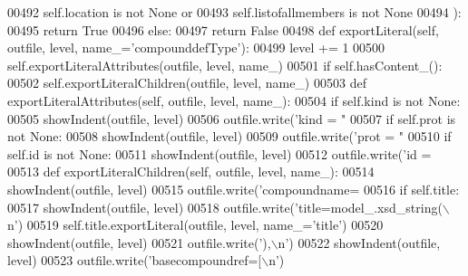 \begin{DoxyCode}
{{{{{{{{{{{{{{{{{{{{{{{{{{{{{{{00492             self.location \textcolor{keywordflow}{is} \textcolor{keywordflow}{not} \textcolor{keywordtype}{None} \textcolor{keywordflow}{or}
00493             self.listofallmembers \textcolor{keywordflow}{is} \textcolor{keywordflow}{not} \textcolor{keywordtype}{None}
00494             ):
00495             \textcolor{keywordflow}{return} \textcolor{keyword}{True}
00496         \textcolor{keywordflow}{else}:
00497             \textcolor{keywordflow}{return} \textcolor{keyword}{False}
00498     \textcolor{keyword}{def }exportLiteral(self, outfile, level, name\_='compounddefType'):
00499         level += 1
00500         self.exportLiteralAttributes(outfile, level, name\_)
00501         \textcolor{keywordflow}{if} self.hasContent_():
00502             self.exportLiteralChildren(outfile, level, name\_)
00503     \textcolor{keyword}{def }exportLiteralAttributes(self, outfile, level, name\_):
00504         \textcolor{keywordflow}{if} self.kind \textcolor{keywordflow}{is} \textcolor{keywordflow}{not} \textcolor{keywordtype}{None}:
00505             showIndent(outfile, level)
00506             outfile.write(\textcolor{stringliteral}{'kind = "%
00507         \textcolor{keywordflow}{if} self.prot \textcolor{keywordflow}{is} \textcolor{keywordflow}{not} \textcolor{keywordtype}{None}:
00508             showIndent(outfile, level)
00509             outfile.write(\textcolor{stringliteral}{'prot = "%
00510         \textcolor{keywordflow}{if} self.id \textcolor{keywordflow}{is} \textcolor{keywordflow}{not} \textcolor{keywordtype}{None}:
00511             showIndent(outfile, level)
00512             outfile.write(\textcolor{stringliteral}{'id = %
00513     \textcolor{keyword}{def }exportLiteralChildren(self, outfile, level, name\_):
00514         showIndent(outfile, level)
00515         outfile.write(\textcolor{stringliteral}{'compoundname=%
00516         \textcolor{keywordflow}{if} self.title:
00517             showIndent(outfile, level)
00518             outfile.write(\textcolor{stringliteral}{'title=model\_.xsd\_string(\(\backslash\)n'})
00519             self.title.exportLiteral(outfile, level, name\_=\textcolor{stringliteral}{'title'})
00520             showIndent(outfile, level)
00521             outfile.write(\textcolor{stringliteral}{'),\(\backslash\)n'})
00522         showIndent(outfile, level)
00523         outfile.write(\textcolor{stringliteral}{'basecompoundref=[\(\backslash\)n'})
}}}}}}}}}}}}}}}}}}}}}}}}}}}}}}}}}}}
\end{DoxyCode}

